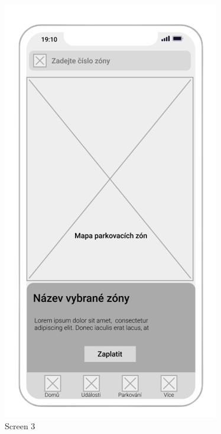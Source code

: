 \begin{figure}[H]
    \includegraphics[width=\linewidth]{parking_wireframe.png}
    \caption{Screen 3}\label{fig:screen3}
  \endminipage\hfill

\end{figure}
